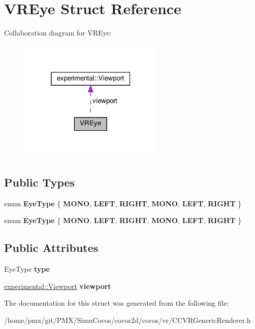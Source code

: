 \hypertarget{structVREye}{}\section{V\+R\+Eye Struct Reference}
\label{structVREye}


Collaboration diagram for V\+R\+Eye\+:
\nopagebreak
\begin{figure}[H]
\begin{center}
\leavevmode
\includegraphics[width=196pt]{structVREye__coll__graph}
\end{center}
\end{figure}
\subsection*{Public Types}
\begin{DoxyCompactItemize}
\item 
\mbox{\label{structVREye_af54f8e04d0bfdd7fe1d15af9e52928a1}} 
enum {\bfseries Eye\+Type} \{ \newline
{\bfseries M\+O\+NO}, 
{\bfseries L\+E\+FT}, 
{\bfseries R\+I\+G\+HT}, 
{\bfseries M\+O\+NO}, 
\newline
{\bfseries L\+E\+FT}, 
{\bfseries R\+I\+G\+HT}
 \}
\item 
\mbox{\label{structVREye_af54f8e04d0bfdd7fe1d15af9e52928a1}} 
enum {\bfseries Eye\+Type} \{ \newline
{\bfseries M\+O\+NO}, 
{\bfseries L\+E\+FT}, 
{\bfseries R\+I\+G\+HT}, 
{\bfseries M\+O\+NO}, 
\newline
{\bfseries L\+E\+FT}, 
{\bfseries R\+I\+G\+HT}
 \}
\end{DoxyCompactItemize}
\subsection*{Public Attributes}
\begin{DoxyCompactItemize}
\item 
\mbox{\label{structVREye_a521c7a6a7b0a5c734181d247c8796400}} 
Eye\+Type {\bfseries type}
\item 
\mbox{\label{structVREye_a8f615cf3d46f99dd9ecbcb4db1d4de1a}} 
\hyperlink{structexperimental_1_1Viewport}{experimental\+::\+Viewport} {\bfseries viewport}
\end{DoxyCompactItemize}


The documentation for this struct was generated from the following file\+:\begin{DoxyCompactItemize}
\item 
/home/pmx/git/\+P\+M\+X/\+Simu\+Cocos/cocos2d/cocos/vr/C\+C\+V\+R\+Generic\+Renderer.\+h\end{DoxyCompactItemize}
